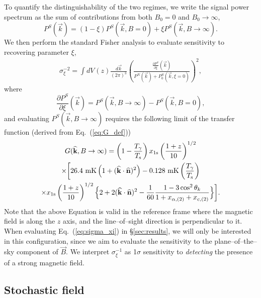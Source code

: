 \documentclass[aps,prd,twocolumn,floatfix,showpacs,superscriptaddress,nofootinbib]{revtex4-1}
\newcommand{\beq}{\begin{equation}}
\newcommand{\eeq}{\end{equation}}
\newcommand{\bga}{\begin{gathered}}
\newcommand{\ega}{\end{gathered}}
\begin{document}
To quantify the distinguishability of the two regimes, we write the signal power spectrum as the sum of contributions from both $B_0=0$ and $B_0\to\infty$, 
\beq
P^S(\vec k) = (1-\xi)P^S(\vec k, B=0) + \xi P^S(\vec k, B\to \infty).
\label{eq:saturated_P}
\eeq
We then perform the standard Fisher analysis to evaluate sensitivity to recovering parameter $\xi$,
\beq
\bga
\sigma_{\xi}^{-2} = 
\int dV_\mathrm{}(z)
\frac{d\vec k}{(2\pi)^3}\left(  \frac{\frac{\partial P^S}{\partial \xi}(\vec k)}{P^N (\vec k)+ P_0^S(\vec k,\xi=0) }\right)^2,
\ega
\label{eq:sigma_xi}
\eeq
where
\beq
\frac{\partial P^S}{\partial \xi}(\vec k) = P^S(\vec k, B\to \infty)-P^S(\vec k, B=0),
\eeq
and evaluating $P^S(\vec k, B\to \infty)$ requires the following limit of the transfer function (derived from Eq.~(\ref{eq:G_def}))
\beq
\bga
G({\bf{\widehat k}}, B\to \infty)
=\left( 1 - \frac{T_\gamma}{T_{\rm s}} \right) x_{1{\rm s}} \left( \frac{1+z}{10} \right)^{1/2} \\
\times \biggl[ 26.4 \ {\rm mK}  \left(1 + ({\bf{\widehat k}} \cdot {\bf{\widehat n}})^2 \right)  
- 0.128 \ {\rm mK} \left( \frac{T_\gamma}{T_{\rm s}} \right)\\
\times x_{1{\rm s}} \left( \frac{1+z}{10} \right)^{1/2}  
 \Bigl\{ 2 + 2({\bf{\widehat k}} \cdot {\bf{\widehat n}})^2 
- \frac{1}{60} \frac{1-3\cos ^2\theta_k}{1+x_{\alpha,(2)}+x_{c,(2)} }\Bigr\} \biggr].
\label{eq:G_Binf}
\ega
\eeq
Note that the above Equation is valid in the reference frame where the magnetic field is along the $z$ axis, and the line--of--sight direction is perpendicular to it. When evaluating Eq.~(\ref{eq:sigma_xi}) in \S\ref{sec:results}, we will only be interested in this configuration, since we aim to evaluate the sensitivity to the plane--of--the--sky component of $\vec B$. We interpret $\sigma_\xi^{-1}$ as 1$\sigma$ sensitivity to \textit{detecting} the presence of a strong magnetic field. 

\subsection{Stochastic field}
\label{subsec:SI_fisher}
\end{document}
